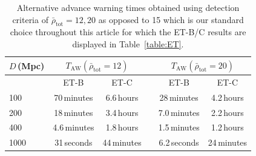 \documentclass[prd,amsmath,amssymb,aps,floats,amsfonts,notitlepage,superscriptaddress,eqsecnum,nofootinbib,10pt]{revtex4-1}
\newcommand\T{\rule{0pt}{2.6ex}}       %
\newcommand\B{\rule[-1.2ex]{0pt}{0pt}} %
\begin{document}
\begin{enumerate}
\begin{table}[h]
\centering
\begin{tabular}{lccccc}
\hline\hline
$D\,$(Mpc)\hspace{2mm} & \multicolumn{2}{c}{$T_\text{AW}(\bar{\rho}_\text{tot}=12)$} & & \multicolumn{2}{c}{$T_\text{AW}(\bar{\rho}_\text{tot}=20)$}\T\B\\
\hline
{}& ET-B & ET-C &\hspace{5mm} & ET-B & ET-C  \T\B\\
100 & 70\,minutes & 6.6\,hours & & 28\,minutes & 4.2\,hours \\
200 & 18\,minutes & 3.4\,hours & & 7.0\,minutes & 2.2\,hours \\
400 & 4.6\,minutes & 1.8\,hours & & 1.5\,minutes & 1.2\,hours \\
1000 & 31\,seconds & 44\,minutes & & 6.2\,seconds & 24\,minutes \\
\hline\hline
\end{tabular}
\caption{Alternative advance warning times obtained using detection criteria of $\bar{\rho}_\text{tot}=12,20$ as opposed to 15 which is our standard choice throughout this article for which the ET-B/C results are displayed in Table~\ref{table:ET}.}\label{table:SNR_12_20_results}
\end{table}
%
%
%
%
\end{enumerate}
%
%
%
\end{document}
